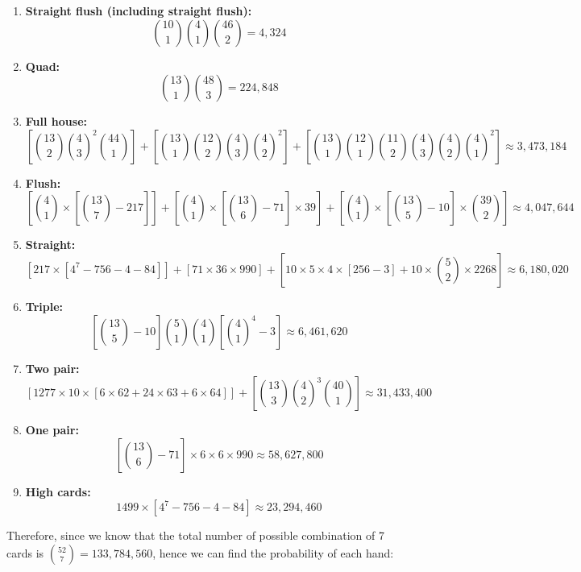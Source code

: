 \documentclass{article}
\begin{document}
\begin{enumerate}
    \item \textbf{Straight flush (including straight flush):}
    \[
        \binom{10}{1} \binom{4}{1} \binom{46}{2} 
        = 4,324
    \]
    \item \textbf{Quad:} 
    \[
        \binom{13}{1} \binom{48}{3} 
        = 224,848
    \]
    \item \textbf{Full house:}
    \[
        \left[ \binom{13}{2} \binom{4}{3}^2 \binom{44}{1} \right]
        + \left[ \binom{13}{1} \binom{12}{2} \binom{4}{3} \binom{4}{2}^2 \right]
        + \left[ \binom{13}{1} \binom{12}{1} \binom{11}{2} \binom{4}{3} \binom{4}{2} \binom{4}{1}^2 \right]
        \approx 3,473,184
    \]
    \item \textbf{Flush:}
    \[
        \left[ \binom{4}{1} \times \left[ \binom{13}{7} - 217 \right] \right]
        + \left[ \binom{4}{1} \times \left[ \binom{13}{6} - 71 \right] \times 39 \right]
        + \left[ \binom{4}{1} \times \left[ \binom{13}{5} - 10 \right] \times \binom{39}{2} \right]
        \approx 4,047,644
    \]
    \item \textbf{Straight:}
    \[
        [217 \times [4^7 - 756 - 4 - 84]] 
        + [71 \times 36 \times 990] 
        + \left[ 10 \times 5 \times 4 \times [256 - 3] + 10 \times \binom{5}{2} \times 2268 \right]
        \approx 6,180,020
    \]
    \item \textbf{Triple:}
    \[
        \left[ \binom{13}{5} - 10 \right] \binom{5}{1} \binom{4}{1} \left[ \binom{4}{1}^4 - 3 \right]
        \approx 6,461,620
    \]
    \item \textbf{Two pair:}
    \[
        [1277 \times 10 \times [6 \times 62 + 24 \times 63 + 6 \times 64]]
        + \left[ \binom{13}{3} \binom{4}{2}^3 \binom{40}{1} \right]
        \approx 31,433,400
    \]
    \item \textbf{One pair:}
    \[
        \left[ \binom{13}{6} - 71 \right] \times 6 \times 6 \times 990
        \approx 58,627,800
    \]
    \item \textbf{High cards:}
    \[
        1499 \times [ 4^7 - 756 - 4 - 84 ]
        \approx 23,294,460
    \]
\end{enumerate}
Therefore, since we know that the total number of possible combination 
of 7 cards is $\displaystyle \binom{52}{7} = 133,784,560$, hence we can 
find the probability of each hand:
\end{document}

